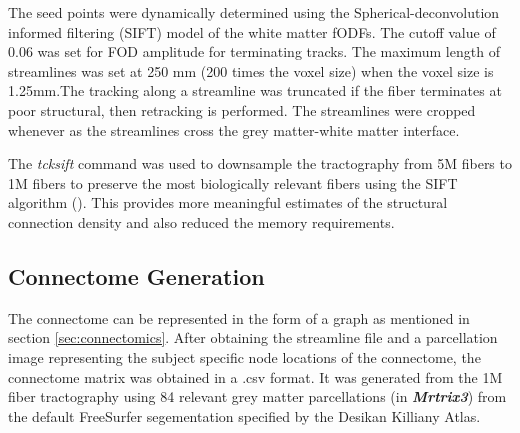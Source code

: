 \documentclass[msthesis.tex]{subfiles}
\begin{document}
The seed points were dynamically determined using the Spherical-deconvolution informed filtering (SIFT) model \cite{smith2013sift} of the white matter fODFs. The cutoff value of 0.06 was set for FOD amplitude for terminating tracks. The maximum length of streamlines was set at 250 mm (200 times the voxel size) when the voxel size is 1.25mm.The tracking along a streamline was truncated if the fiber terminates at poor structural, then  retracking is performed. The streamlines were cropped whenever as the streamlines cross the grey matter-white matter interface. 

The \textit{tcksift} command was used to downsample the tractography from 5M fibers to 1M fibers to preserve the most biologically relevant fibers using the SIFT algorithm (\cite{smith2013sift}). This provides more meaningful estimates of the structural connection density and also reduced the memory requirements. 

\subsection{Connectome Generation}

The connectome can be represented in the form of a graph as mentioned in section \ref{sec:connectomics}. After obtaining the streamline file and a parcellation image representing the subject specific node locations of the connectome, the connectome matrix was obtained in a .csv format. It was generated from the 1M fiber tractography using 84 relevant grey matter parcellations (in \textit{\textbf{Mrtrix3}}) from the default FreeSurfer segementation specified by the Desikan Killiany Atlas. 
\end{document}
